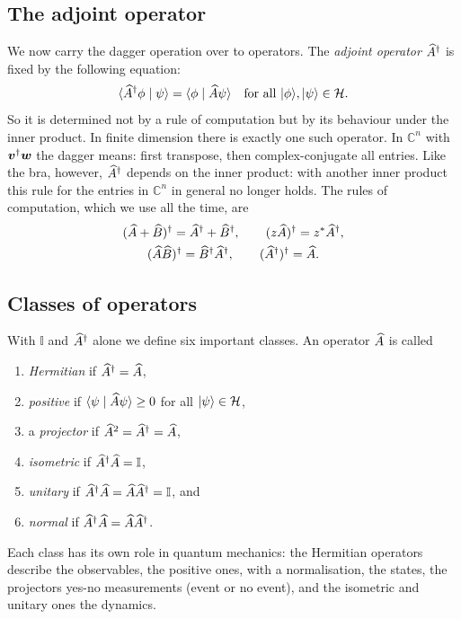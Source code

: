 \subsection{The adjoint operator}
We now carry the dagger operation over to operators. The \emph{adjoint operator} $\widehat{A}^{\dagger}$ is fixed by the following equation:
\begin{equation}
	\langle \widehat{A}^{\dagger}\phi \mid \psi \rangle = \langle \phi \mid \widehat{A}\psi \rangle \quad \text{for all } \lvert \phi \rangle,\lvert \psi \rangle\in\mathcal{H}.
\end{equation}
So it is determined not by a rule of computation but by its behaviour under the inner product. In finite dimension there is exactly one such operator. In $\mathbb{C}^n$ with $\boldsymbol{v}^{\dagger}\boldsymbol{w}$ the dagger means: first transpose, then complex-conjugate all entries. Like the bra, however, $\widehat{A}^{\dagger}$ depends on the inner product: with another inner product this rule for the entries in $\mathbb{C}^n$ in general no longer holds. The rules of computation, which we use all the time, are
\begin{equation}
	\begin{gathered}
		(\widehat{A} + \widehat{B})^{\dagger} = \widehat{A}^{\dagger} + \widehat{B}^{\dagger}, \qquad (z\widehat{A})^{\dagger} = z^*\widehat{A}^{\dagger}, \\
		(\widehat{A}\widehat{B})^{\dagger} = \widehat{B}^{\dagger}\widehat{A}^{\dagger}, \qquad (\widehat{A}^{\dagger})^{\dagger} = \widehat{A}.
	\end{gathered}
\end{equation}

\subsection{Classes of operators}
With $\mathbb{I}$ and $\widehat{A}^{\dagger}$ alone we define six important classes. An operator $\widehat{A}$ is called
\begin{enumerate}
	\item \emph{Hermitian} if $\widehat{A}^{\dagger} = \widehat{A}$,
	\item \emph{positive} if $\langle \psi \mid \widehat{A}\psi \rangle \geq 0$ for all $\lvert \psi \rangle\in\mathcal{H}$,
	\item a \emph{projector} if $\widehat{A}^2 = \widehat{A}^{\dagger} = \widehat{A}$,
	\item \emph{isometric} if $\widehat{A}^{\dagger}\widehat{A} = \mathbb{I}$,
	\item \emph{unitary} if $\widehat{A}^{\dagger}\widehat{A} = \widehat{A}\widehat{A}^{\dagger} = \mathbb{I}$, and
	\item \emph{normal} if $\widehat{A}^{\dagger}\widehat{A} = \widehat{A}\widehat{A}^{\dagger}$.
\end{enumerate}
Each class has its own role in quantum mechanics: the Hermitian operators describe the observables, the positive ones, with a normalisation, the states, the projectors yes-no measurements (event or no event), and the isometric and unitary ones the dynamics.

